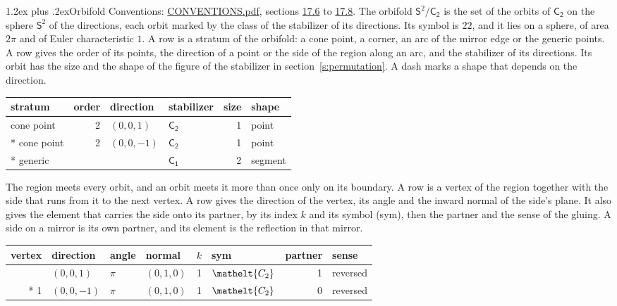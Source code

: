 \documentclass[10pt,a4paper]{article}
\makeatletter
\renewcommand\section{\@startsection{section}{1}{\z@}{-3ex plus -1ex minus -.2ex}%
  {1.2ex plus .2ex}{\normalfont\large\sffamily\bfseries\color{parttitle}}}
\numberwithin{equation}{section}
\newcommand{\eltfont}[1]{{\let\sigma\eltsigma\mathelt{#1}}}
\newcommand{\grp}[1]{\mathsf{#1}}
\newcommand{\cls}[1]{\eltfont{#1}}
\newcommand{\orbname}[1]{#1}
\newcommand{\dirvec}[3]{(#1, #2, #3)}
\newcommand{\twosphere}{\mathsf{S}^{2}}
\makeatother
\begin{document}
\section{Orbifold}\label{s:orbifold}
Conventions: \href{../../CONVENTIONS.pdf}{CONVENTIONS.pdf}, sections \href{../../CONVENTIONS.pdf\#conv.17.6}{17.6} to \href{../../CONVENTIONS.pdf\#conv.17.8}{17.8}.
The orbifold $\twosphere/\grp{C_{2}}$ is the set of the orbits of $\grp{C_{2}}$ on the sphere $\twosphere$ of the directions, each orbit marked by the class of the stabilizer of its directions. Its symbol is $\orbname{22}$, and it lies on a sphere, of area $2\pi$ and of Euler characteristic $1$.
\leavevmode\label{n:head.stratum}\label{n:head.order.point}\label{n:head.direction}\label{n:head.stabilizer}\label{n:head.size.orbit}\label{n:head.shape}A row is a stratum of the orbifold: a cone point, a corner, an arc of the mirror edge or the generic points. A row gives the order of its points, the direction of a point or the side of the region along an arc, and the stabilizer of its directions. Its orbit has the size and the shape of the figure of the stabilizer in section~\ref{s:permutation}. A dash marks a shape that depends on the direction.
{\small\setlength{\tabcolsep}{4pt}\begin{longtable}{@{}lrllrl@{}}\toprule
stratum & order & direction & stabilizer & size & shape\\\midrule\endhead
\bottomrule\endfoot\endlastfoot
cone point & 2 & $\dirvec{0}{0}{1}$ & \href{C2.pdf}{$\grp{C_{2}}$} & 1 & point\\*
cone point & 2 & $\dirvec{0}{0}{-1}$ & \href{C2.pdf}{$\grp{C_{2}}$} & 1 & point\\*
generic &  &  & \href{C1.pdf}{$\grp{C_{1}}$} & 2 & segment\\
\bottomrule\end{longtable}}
\leavevmode\label{n:head.vertex.region}\label{n:head.angle}\label{n:head.normal.side}\label{n:head.partner}\label{n:head.sense}The region meets every orbit, and an orbit meets it more than once only on its boundary. A row is a vertex of the region together with the side that runs from it to the next vertex. A row gives the direction of the vertex, its angle and the inward normal of the side's plane. It also gives the element that carries the side onto its partner, by its index $k$ and its symbol (sym), then the partner and the sense of the gluing. A side on a mirror is its own partner, and its element is the reflection in that mirror.
{\small\setlength{\tabcolsep}{4pt}\begin{longtable}{@{}rlllrlrl@{}}\toprule
vertex & direction & angle & normal & $k$ & sym & partner & sense\\\midrule\endhead
\bottomrule\endfoot\endlastfoot
0 & $\dirvec{0}{0}{1}$ & $\pi$ & $\dirvec{0}{1}{0}$ & 1 & $\cls{C_{2}}$ & 1 & reversed\\*
1 & $\dirvec{0}{0}{-1}$ & $\pi$ & $\dirvec{0}{1}{0}$ & 1 & $\cls{C_{2}}$ & 0 & reversed\\
\bottomrule\end{longtable}}
\end{document}
